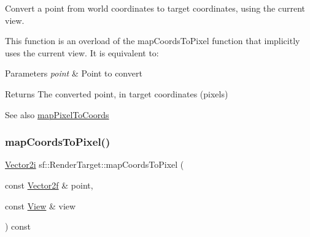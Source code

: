 Convert a point from world coordinates to target coordinates, using the current view. 

This function is an overload of the map\+Coords\+To\+Pixel function that implicitly uses the current view. It is equivalent to\+: 
\begin{DoxyCode}{0}
\end{DoxyCode}



\begin{DoxyParams}{Parameters}
{\em point} & Point to convert\\
\hline
\end{DoxyParams}
\begin{DoxyReturn}{Returns}
The converted point, in target coordinates (pixels)
\end{DoxyReturn}
\begin{DoxySeeAlso}{See also}
\mbox{\hyperlink{classsf_1_1_render_target_a0103ebebafa43a97e6e6414f8560d5e3}{map\+Pixel\+To\+Coords}} \begin{DoxyVerb}\end{DoxyVerb}
 
\end{DoxySeeAlso}
\mbox{\label{classsf_1_1_render_target_a848eee44b72ac3f16fa9182df26e83bc}} 
\subsubsection{\texorpdfstring{mapCoordsToPixel()}{mapCoordsToPixel()}\hspace{0.1cm}{\footnotesize\ttfamily [2/2]}}
{\footnotesize\ttfamily \mbox{\hyperlink{classsf_1_1_vector2}{Vector2i}} sf\+::\+Render\+Target\+::map\+Coords\+To\+Pixel (\begin{DoxyParamCaption}\item[{const \mbox{\hyperlink{classsf_1_1_vector2}{Vector2f}} \&}]{point,  }\item[{const \mbox{\hyperlink{classsf_1_1_view}{View}} \&}]{view }\end{DoxyParamCaption}) const}



